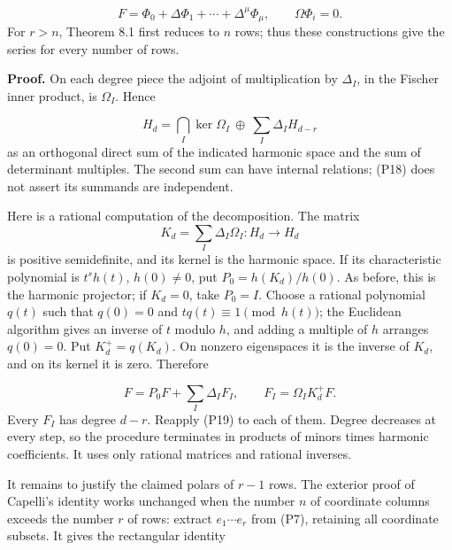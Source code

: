 \documentclass[
]{article}
\begin{document}
\[
F=\Phi_0+\Delta\Phi_1+\cdots+\Delta^\mu\Phi_\mu,
\qquad \Omega\Phi_i=0.
\tag{P17}
\] For \(r>n\), Theorem 8.1 first reduces to \(n\) rows; thus these
constructions give the series for every number of rows.

\textbf{Proof.} On each degree piece the adjoint of multiplication by
\(\Delta_I\), in the Fischer inner product, is \(\Omega_I\). Hence
\protect{}\label{equation-P18}{}

\[
H_d=\bigcap_I\ker\Omega_I\ \oplus\
\sum_I\Delta_I H_{d-r}
\tag{P18}
\] as an orthogonal direct sum of the indicated harmonic space and the
sum of determinant multiples. The second sum can have internal
relations; (P18) does not assert its summands are independent.

Here is a rational computation of the decomposition. The matrix \[
K_d=\sum_I \Delta_I\Omega_I:H_d\to H_d
\] is positive semidefinite, and its kernel is the harmonic space. If
its characteristic polynomial is \(t^s h(t)\), \(h(0)\ne0\), put
\(P_0=h(K_d)/h(0)\). As before, this is the harmonic projector; if
\(K_d=0\), take \(P_0=I\). Choose a rational polynomial \(q(t)\) such
that \(q(0)=0\) and \(tq(t)\equiv1\pmod{h(t)}\); the Euclidean algorithm
gives an inverse of \(t\) modulo \(h\), and adding a multiple of \(h\)
arranges \(q(0)=0\). Put \(K_d^+=q(K_d)\). On nonzero eigenspaces it is
the inverse of \(K_d\), and on its kernel it is zero. Therefore
\protect{}\label{equation-P19}{}

\[
F=P_0F+\sum_I\Delta_I F_I,\qquad
F_I=\Omega_I K_d^+F.
\tag{P19}
\] Every \(F_I\) has degree \(d-r\). Reapply (P19) to each of them.
Degree decreases at every step, so the procedure terminates in products
of minors times harmonic coefficients. It uses only rational matrices
and rational inverses.

It remains to justify the claimed polars of \(r-1\) rows. The exterior
proof of Capelli's identity works unchanged when the number \(n\) of
coordinate columns exceeds the number \(r\) of rows: extract
\(e_1\cdots e_r\) from (P7), retaining all coordinate subsets. It gives
the rectangular identity \protect\phantomsection\label{equation-P20}{}
\end{document}
